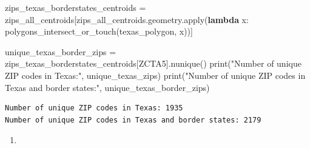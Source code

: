 \documentclass[
  letterpaper,
  DIV=11,
  numbers=noendperiod]{scrartcl}
\newenvironment{Shaded}{\begin{snugshade}}{\end{snugshade}}
\newcommand{\BuiltInTok}[1]{\textcolor[rgb]{0.00,0.23,0.31}{#1}}
\newcommand{\KeywordTok}[1]{\textcolor[rgb]{0.00,0.23,0.31}{\textbf{#1}}}
\newcommand{\NormalTok}[1]{\textcolor[rgb]{0.00,0.23,0.31}{#1}}
\newcommand{\OperatorTok}[1]{\textcolor[rgb]{0.37,0.37,0.37}{#1}}
\newcommand{\StringTok}[1]{\textcolor[rgb]{0.13,0.47,0.30}{#1}}
\providecommand{\tightlist}{%
  \setlength{\itemsep}{0pt}\setlength{\parskip}{0pt}}\usepackage{longtable,booktabs,array}
\begin{document}
\begin{Shaded}
\begin{Highlighting}[]
\NormalTok{zips\_texas\_borderstates\_centroids }\OperatorTok{=}\NormalTok{ zips\_all\_centroids[zips\_all\_centroids.geometry.}\BuiltInTok{apply}\NormalTok{(}\KeywordTok{lambda}\NormalTok{ x: polygons\_intersect\_or\_touch(texas\_polygon, x))]}

\NormalTok{unique\_texas\_border\_zips }\OperatorTok{=}\NormalTok{ zips\_texas\_borderstates\_centroids[}\StringTok{\textquotesingle{}ZCTA5\textquotesingle{}}\NormalTok{].nunique()}
\BuiltInTok{print}\NormalTok{(}\StringTok{"Number of unique ZIP codes in Texas:"}\NormalTok{, unique\_texas\_zips)}
\BuiltInTok{print}\NormalTok{(}\StringTok{"Number of unique ZIP codes in Texas and border states:"}\NormalTok{, unique\_texas\_border\_zips)}
\end{Highlighting}
\end{Shaded}

\begin{verbatim}
Number of unique ZIP codes in Texas: 1935
Number of unique ZIP codes in Texas and border states: 2179
\end{verbatim}

\begin{enumerate}
\def\labelenumi{\arabic{enumi}.}
\setcounter{enumi}{2}
\tightlist
\item
\end{enumerate}
\end{document}
